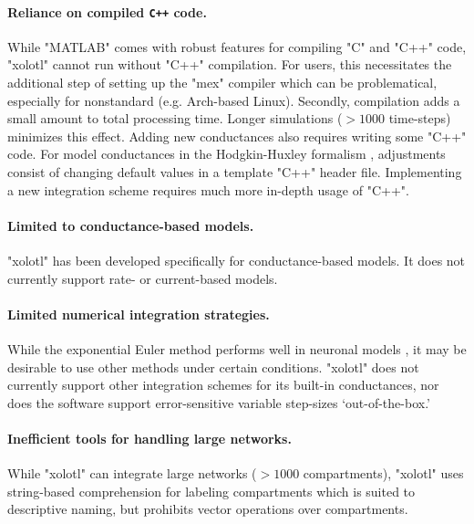 \documentclass{frontiersSCNS} %
\begin{document}
\paragraph{Reliance on compiled \texttt{C++} code.} While "MATLAB" comes with robust features for compiling "C" and "C++" code, "xolotl" cannot run without "C++" compilation. For users, this necessitates the additional step of setting up the "mex" compiler which can be problematical, especially for nonstandard (e.g. Arch-based Linux). Secondly, compilation adds a small amount to total processing time. Longer simulations ($>1000$ time-steps) minimizes this effect. Adding new conductances also requires writing some "C++" code. For model conductances in the Hodgkin-Huxley formalism \autocite{hodgkinMeasurementCurrentvoltageRelations1952, dayanTheoreticalNeuroscience2001}, adjustments consist of changing default values in a template "C++" header file. Implementing a new integration scheme requires much more in-depth usage of "C++".

\paragraph{Limited to conductance-based models.} "xolotl" has been developed specifically for conductance-based models. It does not currently support rate- or current-based models.

\paragraph{Limited numerical integration strategies.} While the exponential Euler method performs well in neuronal models \autocite{ohErrorAnalysisSpecialized2006, dayanTheoreticalNeuroscience2001}, it may be desirable to use other methods under certain conditions. "xolotl" does not currently support other integration schemes for its built-in conductances, nor does the software support error-sensitive variable step-sizes `out-of-the-box.'

\paragraph{Inefficient tools for handling large networks.} While "xolotl" can integrate large networks ($>1000$ compartments), "xolotl" uses string-based comprehension for labeling compartments which is suited to descriptive naming, but prohibits vector operations over compartments.

%
%
%
%
%
%
\end{document}
